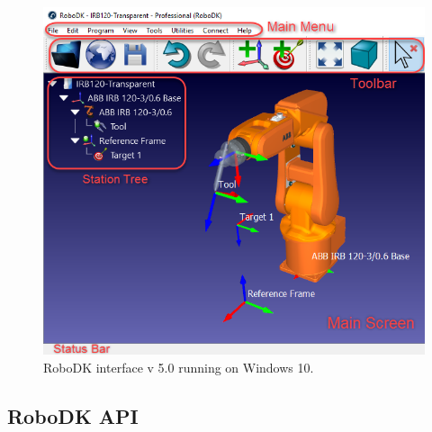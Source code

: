 \begin{figure}[h]
    \centering
    \includegraphics[width=0.9\linewidth]{img/robodk_interface.png}
    \caption{RoboDK interface v 5.0 running on Windows 10.}
    \label{fig:robodkinterface}
\end{figure}

\subsection{RoboDK API}


